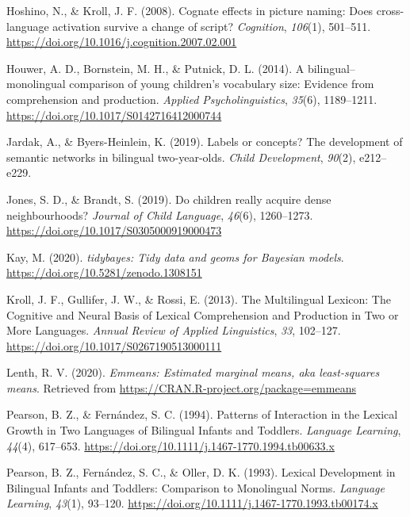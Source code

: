 \documentclass[
  english,
  man,man,floatsintext]{apa6}
\newlength{\cslhangindent}
\newenvironment{cslreferences}%
  {\setlength{\parindent}{0pt}%
  \everypar{\setlength{\hangindent}{\cslhangindent}}\ignorespaces}%
  {\par}
\begin{document}
\begin{cslreferences}
\leavevmode\hypertarget{ref-hoshino_cognate_2008}{}%
Hoshino, N., \& Kroll, J. F. (2008). Cognate effects in picture naming: Does cross-language activation survive a change of script? \emph{Cognition}, \emph{106}(1), 501--511. \url{https://doi.org/10.1016/j.cognition.2007.02.001}

\leavevmode\hypertarget{ref-houwer_bilingualmonolingual_2014}{}%
Houwer, A. D., Bornstein, M. H., \& Putnick, D. L. (2014). A bilingual--monolingual comparison of young children's vocabulary size: Evidence from comprehension and production. \emph{Applied Psycholinguistics}, \emph{35}(6), 1189--1211. \url{https://doi.org/10.1017/S0142716412000744}

\leavevmode\hypertarget{ref-jardak2019labels}{}%
Jardak, A., \& Byers-Heinlein, K. (2019). Labels or concepts? The development of semantic networks in bilingual two-year-olds. \emph{Child Development}, \emph{90}(2), e212--e229.

\leavevmode\hypertarget{ref-jones_children_2019}{}%
Jones, S. D., \& Brandt, S. (2019). Do children really acquire dense neighbourhoods? \emph{Journal of Child Language}, \emph{46}(6), 1260--1273. \url{https://doi.org/10.1017/S0305000919000473}

\leavevmode\hypertarget{ref-kay_tidybayes_2020}{}%
Kay, M. (2020). \emph{tidybayes: Tidy data and geoms for Bayesian models}. \url{https://doi.org/10.5281/zenodo.1308151}

\leavevmode\hypertarget{ref-kroll_multilingual_2013}{}%
Kroll, J. F., Gullifer, J. W., \& Rossi, E. (2013). The Multilingual Lexicon: The Cognitive and Neural Basis of Lexical Comprehension and Production in Two or More Languages. \emph{Annual Review of Applied Linguistics}, \emph{33}, 102--127. \url{https://doi.org/10.1017/S0267190513000111}

\leavevmode\hypertarget{ref-lenth_emmeans_2020}{}%
Lenth, R. V. (2020). \emph{Emmeans: Estimated marginal means, aka least-squares means}. Retrieved from \url{https://CRAN.R-project.org/package=emmeans}

\leavevmode\hypertarget{ref-pearson_patterns_1994}{}%
Pearson, B. Z., \& Fernández, S. C. (1994). Patterns of Interaction in the Lexical Growth in Two Languages of Bilingual Infants and Toddlers. \emph{Language Learning}, \emph{44}(4), 617--653. \url{https://doi.org/10.1111/j.1467-1770.1994.tb00633.x}

\leavevmode\hypertarget{ref-pearson_lexical_1993}{}%
Pearson, B. Z., Fernández, S. C., \& Oller, D. K. (1993). Lexical Development in Bilingual Infants and Toddlers: Comparison to Monolingual Norms. \emph{Language Learning}, \emph{43}(1), 93--120. \url{https://doi.org/10.1111/j.1467-1770.1993.tb00174.x}


\end{cslreferences}
\end{document}
